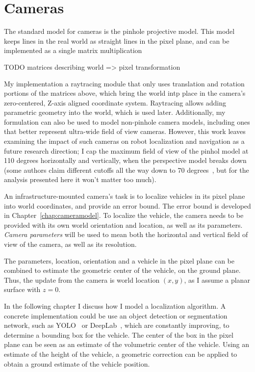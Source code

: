 \documentclass[a4paper,12pt,twoside,openright]{report}
\begin{document}
\section{Cameras}
\label{impl:sensors}

The standard model for cameras is the pinhole projective model. This model 
keeps lines in the real world as straight lines in the pixel plane,
and can be implemented as a single matrix multiplication

TODO matrices describing world => pixel transformation

My implementation a raytracing module that only uses
translation and rotation portions of the matrices above, which bring the world intp place
in the camera's zero-centered, Z-axis aligned coordinate system. Raytracing
allows adding parametric geometry into the world, which is used later.
Additionally, my formulation can also be used to model non-pinhole camera models,
including ones that better represent ultra-wide field of view cameras. However, this work leaves
examining the impact of such cameras on robot localization and navigation as
a future research direction; I cap the maximum field of view of the pinhol model
at 110 degrees horizontally and vertically, when the perspective model
breaks down~\cite{fleckperspective} (some authors claim different cutoffs all the way down
to 70 degrees~\cite{sharpless2010pannini}, but for the analysis presented here it won't 
matter too much). 

An infrastructure-mounted camera's task is to localize vehicles in its pixel plane 
into world coordinates, and provide an error bound. The error bound is developed 
in Chapter~\ref{chap:cameramodel}. To localize the vehicle, the camera needs to
be provided with its own world orientation and location, as well as its parameters.
\textit{Camera parameters} will be used to mean both the horizontal
and vertical field of view of the camera, as well as its resolution. 

The parameters, location, orientation and a vehicle in the pixel plane can be
combined to estimate the geometric center of the vehicle, on the ground plane. Thus,
the update from the camera is world location $(x,y)$, as I assume a planar surface
with $z = 0$.

In the following chapter I discuss how I model a localization algorithm. A 
concrete implementation could be use an object detection or segmentation network,
such as YOLO~\cite{redmon2018yolov3} or DeepLab~\cite{chen2017rethinking}, which are constantly
improving, to determine a bounding box for the vehicle. The center of the box in the pixel plane
can be seen as an estimate of the volumetric center of the vehicle. 
Using an estimate of the height of the vehicle, a geometric correction can be applied 
to obtain a ground estimate of the vehicle position. %
\end{document}
